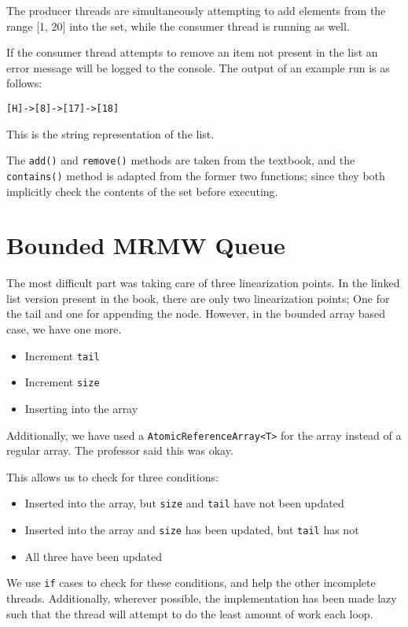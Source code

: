 \documentclass[12pt,letterpaper,titlepage]{article}
\begin{document}
    The producer threads are simultaneously attempting to add elements from the range [1, 20] into the set, while the consumer thread is running as well.
    
    If the consumer thread attempts to remove an item not present in the list an error message will be logged to the console. The output of an example run is as follows:
    \begin{verbatim}
[H]->[8]->[17]->[18]
    \end{verbatim}
    This is the string representation of the list.
    
    The \texttt{add()} and \texttt{remove()} methods are taken from the textbook, and the \texttt{contains()} method is adapted from the former two functions; since they both implicitly check the contents of the set before executing.
  
  \section{Bounded MRMW Queue}
      The most difficult part was taking care of three linearization points. In the linked list version present in the book, there are only two linearization points; One for the tail and one for appending the node. However, in the bounded array based case, we have one more.
      \begin{itemize}
        \itemsep 0em
        \item Increment \texttt{tail}
        \item Increment \texttt{size}
        \item Inserting into the array
      \end{itemize}
      Additionally, we have used a \texttt{AtomicReferenceArray<T>} for the array instead of a regular array. The professor said this was okay.
      
      This allows us to check for three conditions:
      \begin{itemize}
        \itemsep 0em
        \item Inserted into the array, but \texttt{size} and \texttt{tail} have not been updated
        \item Inserted into the array and \texttt{size} has been updated, but \texttt{tail} has not
        \item All three have been updated
      \end{itemize}
    
      We use \texttt{if} cases to check for these conditions, and help the other incomplete threads. Additionally, wherever possible, the implementation has been made lazy such that the thread will attempt to do the least amount of work each loop.
      
\end{document}
